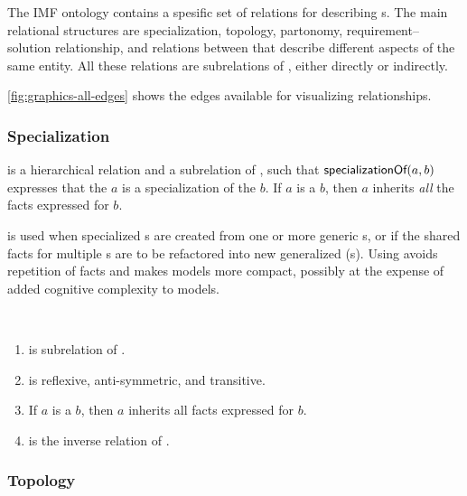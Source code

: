 The IMF ontology contains a spesific set of relations for describing s. The
main relational structures are specialization, topology, partonomy,
requirement--solution relationship, and relations between
 that describe different aspects of the same entity.
All these relations are subrelations of , either directly or indirectly.

\autoref{fig:graphics-all-edges} shows the edges available for visualizing
relationships.




\subsubsection{Specialization}

 is a hierarchical relation and a subrelation of ,
such that $\textsf{specializationOf}(a,b)$ expresses that
the  $a$ is a specialization of the  $b$.  If
$a$ is a  $b$, then $a$ inherits \emph{all} the
facts expressed for $b$. 

 is used when specialized s are
created from one or more generic s,
%
or if the shared facts for multiple s are to be refactored
into new generalized (s). Using  avoids
repetition of facts and makes models more compact, possibly at the
expense of added cognitive complexity to models.

\begin{axioms}~
  \begin{enumerate}[resume=axioms,{label=(\arabic*)}]
  \item {} is subrelation of .
  \item {} is reflexive, anti-symmetric, and transitive.
  \item If $a$ is a  $b$, then $a$ inherits all
    facts expressed for $b$.
  \item {} is the inverse relation of .
  \end{enumerate}
\end{axioms}




\subsubsection{Topology}
\label{sec:topology}

